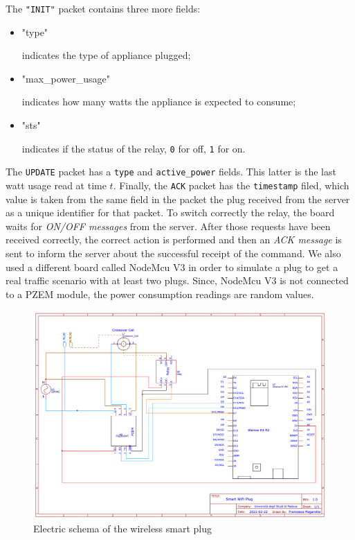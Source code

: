 \documentclass[conference]{IEEEtran}
\begin{document}
	The \verb|"INIT"| packet contains three more fields:
	\begin{itemize}
		\item \begin{spverbatim}"type"\end{spverbatim} indicates the type of appliance plugged;
		\item \begin{spverbatim}"max_power_usage"\end{spverbatim} indicates how many watts the appliance is expected to consume;
		\item \begin{spverbatim}"sts"\end{spverbatim} indicates if the status of the relay, \verb|0| for off, \verb|1| for on.
	\end{itemize}
	The \verb|UPDATE| packet has a \verb|type| and \verb|active_power| fields. This latter is the last watt usage read at time $t$. Finally, the \verb|ACK| packet has the \verb|timestamp| filed, which value is taken from the same field in the packet the plug received from the server as a unique identifier for that packet.
	To switch correctly the relay, the board waits for \textit{ON/OFF messages} from the server. After those requests have been received correctly, the correct action is performed and then an \textit{ACK message} is sent to inform the server about the successful receipt of the command. 
	We also used a different board called NodeMcu V3 in order to simulate a plug to get a real traffic scenario with at least two plugs. Since, NodeMcu V3 is not connected to a PZEM module, the power consumption readings are random values.  
	\begin{figure}[htbp]
		\centering
		\includegraphics[width=\linewidth]{assets/pcb_schema}
		\caption{Electric schema of the wireless smart plug}
		\label{fig:pcbschema}
	\end{figure}
\end{document}
